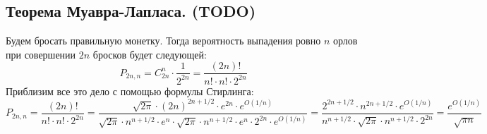 \subsection{Теорема Муавра-Лапласа. (TODO)}
Будем бросать правильную монетку. Тогда вероятность выпадения ровно $n$ орлов при совершении $2n$ бросков будет следующей:
\[
    P_{2n, n} = C_{2n}^n \cdot \frac{1}{2^{2n}} = \frac{(2n)!}{n! \cdot n! \cdot 2^{2n}}
\]
Приблизим все это дело с помощью формулы Стирлинга:
\[
    P_{2n, n} = \frac{(2n)!}{n! \cdot n! \cdot 2^{2n}} =
    \frac{
        \sqrt{2\pi} \cdot (2n)^{2n + 1/2} \cdot e^{2n} \cdot e^{O(1/n)}
    }{
        \sqrt{2\pi} \cdot n^{n + 1/2} \cdot e^{n} \cdot
        \sqrt{2\pi} \cdot n^{n + 1/2} \cdot e^{n} \cdot
        2^{2n}  \cdot e^{O(1/n)}
    } =
    \frac{
        2^{2n + 1/2} \cdot n^{2n + 1/2}  \cdot e^{O(1/n)}
    }{
        n^{n + 1/2} \cdot
        \sqrt{2\pi} \cdot n^{n + 1/2} \cdot
        2^{2n}
    } =
    \frac{
        e^{O(1/n)}
    }{
        \sqrt{\pi n}
    }
\]
